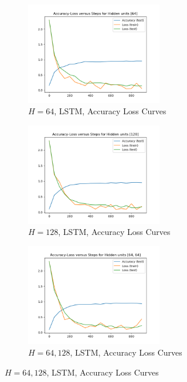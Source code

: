 \begin{figure}[!htbp]
\begin{subfigure}
\centering
\includegraphics[angle=0,width=0.65\textwidth]{assign-3/logs/Q1-MNIST-LSTM-[64].png}
\caption{$H=64$, LSTM, Accuracy Loss Curves}
\end{subfigure}
\begin{subfigure}
\centering
\includegraphics[angle=0,width=0.65\textwidth]{assign-3/logs/Q1-MNIST-LSTM-[128].png}
\caption{$H=128$, LSTM, Accuracy Loss Curves}
\end{subfigure}
\begin{subfigure}
\centering
\includegraphics[angle=0,width=0.65\textwidth]{assign-3/logs/Q1-MNIST-LSTM-[64, 64].png}
\caption{$H=64, 128$, LSTM, Accuracy Loss Curves}
\end{subfigure}
\end{figure}
